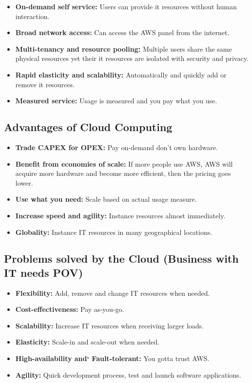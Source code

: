 \begin{itemize}
	\item \textbf{On-demand self service:} Users can provide it resources without human interaction.
	\item \textbf{Broad network access:} Can access the AWS panel from the internet.
	\item \textbf{Multi-tenancy and resource pooling:} Multiple users share the same physical resources yet their it resources are isolated with security and privacy.
	\item \textbf{Rapid elasticity and scalability:} Automatically and quickly add or remove it resources.
	\item \textbf{Measured service:} Usage is measured and you pay what you use.
\end{itemize}

\subsection{Advantages of Cloud Computing}\label{subsec:advantages-of-cloud-computing}

\begin{itemize}
	\item \textbf{Trade CAPEX for OPEX:} Pay on-demand don't own hardware.
	\item \textbf{Benefit from economies of scale:} If more people use AWS, AWS will acquire more hardware and become more efficient, then the pricing goes lower.
	\item \textbf{Use what you need:} Scale based on actual usage measure.
	\item \textbf{Increase speed and agility:} Instance resources almost immediately.
	\item \textbf{Globality:} Instance IT resources in many geographical locations.
\end{itemize}

\subsection{Problems solved by the Cloud (Business with IT needs POV)}\label{subsec:problems-solved-by-the-cloud-(business-with-it-needs-pov)}
\begin{itemize}
	\item \textbf{Flexibility:} Add, remove and change IT resources when needed.
	\item \textbf{Cost-effectiveness:} Pay as-you-go.
	\item \textbf{Scalability:} Increase IT resources when receiving larger loads.
	\item \textbf{Elasticity:} Scale-in and scale-out when needed.
	\item \textbf{High-availability and` Fault-tolerant:} You gotta trust AWS.
	\item \textbf{Agility:} Quick development process, test and launch software applications.
\end{itemize}

